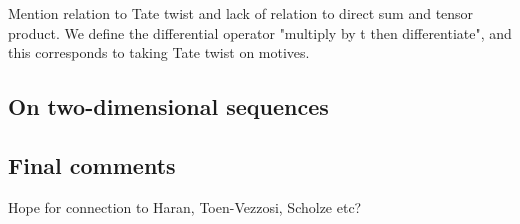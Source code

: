 \documentclass[paper=a4, fontsize=11pt]{scrartcl} %
\numberwithin{equation}{section} %
\numberwithin{figure}{section} %
\numberwithin{table}{section} %
\begin{document}
Mention relation to Tate twist and lack of relation to direct sum and tensor product. We define the differential operator "multiply by t then differentiate", and this corresponds to taking Tate twist on motives.

\subsection{On two-dimensional sequences}



\subsection{Final comments}

Hope for connection to Haran, Toen-Vezzosi, Scholze etc?



\end{document}
